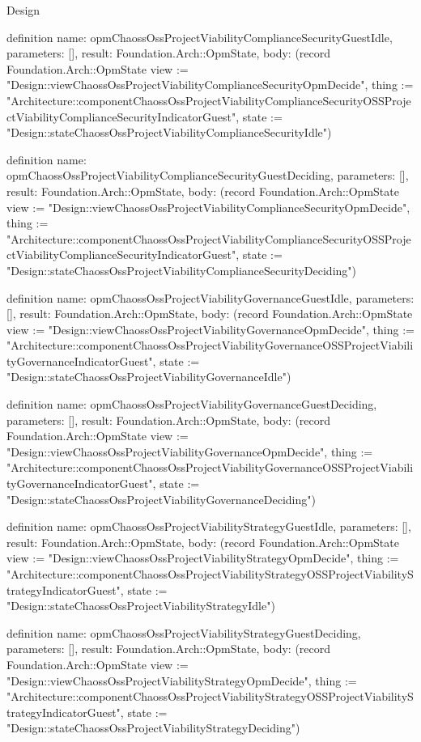\begin{lexlean}{Design}
\begin{semanticmodule}
definition{
  name: opmChaossOssProjectViabilityComplianceSecurityGuestIdle,
  parameters: [],
  result: Foundation.Arch::OpmState,
  body: (record Foundation.Arch::OpmState {view := "Design::viewChaossOssProjectViabilityComplianceSecurityOpmDecide", thing := "Architecture::componentChaossOssProjectViabilityComplianceSecurityOSSProjectViabilityComplianceSecurityIndicatorGuest", state := "Design::stateChaossOssProjectViabilityComplianceSecurityIdle"})
}

definition{
  name: opmChaossOssProjectViabilityComplianceSecurityGuestDeciding,
  parameters: [],
  result: Foundation.Arch::OpmState,
  body: (record Foundation.Arch::OpmState {view := "Design::viewChaossOssProjectViabilityComplianceSecurityOpmDecide", thing := "Architecture::componentChaossOssProjectViabilityComplianceSecurityOSSProjectViabilityComplianceSecurityIndicatorGuest", state := "Design::stateChaossOssProjectViabilityComplianceSecurityDeciding"})
}

definition{
  name: opmChaossOssProjectViabilityGovernanceGuestIdle,
  parameters: [],
  result: Foundation.Arch::OpmState,
  body: (record Foundation.Arch::OpmState {view := "Design::viewChaossOssProjectViabilityGovernanceOpmDecide", thing := "Architecture::componentChaossOssProjectViabilityGovernanceOSSProjectViabilityGovernanceIndicatorGuest", state := "Design::stateChaossOssProjectViabilityGovernanceIdle"})
}

definition{
  name: opmChaossOssProjectViabilityGovernanceGuestDeciding,
  parameters: [],
  result: Foundation.Arch::OpmState,
  body: (record Foundation.Arch::OpmState {view := "Design::viewChaossOssProjectViabilityGovernanceOpmDecide", thing := "Architecture::componentChaossOssProjectViabilityGovernanceOSSProjectViabilityGovernanceIndicatorGuest", state := "Design::stateChaossOssProjectViabilityGovernanceDeciding"})
}

definition{
  name: opmChaossOssProjectViabilityStrategyGuestIdle,
  parameters: [],
  result: Foundation.Arch::OpmState,
  body: (record Foundation.Arch::OpmState {view := "Design::viewChaossOssProjectViabilityStrategyOpmDecide", thing := "Architecture::componentChaossOssProjectViabilityStrategyOSSProjectViabilityStrategyIndicatorGuest", state := "Design::stateChaossOssProjectViabilityStrategyIdle"})
}

definition{
  name: opmChaossOssProjectViabilityStrategyGuestDeciding,
  parameters: [],
  result: Foundation.Arch::OpmState,
  body: (record Foundation.Arch::OpmState {view := "Design::viewChaossOssProjectViabilityStrategyOpmDecide", thing := "Architecture::componentChaossOssProjectViabilityStrategyOSSProjectViabilityStrategyIndicatorGuest", state := "Design::stateChaossOssProjectViabilityStrategyDeciding"})
}


\end{semanticmodule}
\end{lexlean}
